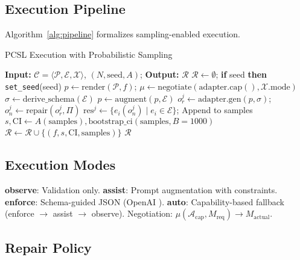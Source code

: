 \documentclass[sigconf]{acmart}
\newcommand{\breakablefunction}[1]{\texttt{\seqsplit{#1}}}
\begin{document}
\subsection{Execution Pipeline}

Algorithm~\ref{alg:pipeline} formalizes sampling-enabled execution.

\begin{algorithm}[t]
\caption{PCSL Execution with Probabilistic Sampling}
\label{alg:pipeline}
\footnotesize
\begin{algorithmic}[1]
\STATE \textbf{Input:} \( \mathcal{C} = \langle \mathcal{P}, \mathcal{E}, \mathcal{X} \rangle \), \( (N, \text{seed}, A) \); \textbf{Output:} \( \mathcal{R} \)
\STATE \( \mathcal{R} \leftarrow \emptyset \); \textbf{if} seed \textbf{then} \texttt{set\_seed}(seed)
  \STATE \( p \leftarrow \text{render}(\mathcal{P}, f) \); \( \mu \leftarrow \text{negotiate}(\text{adapter.cap}(), \mathcal{X}.\text{mode}) \)
   \STATE \( \sigma \leftarrow \text{derive\_schema}(\mathcal{E}) \) \ENDIF
   \STATE \( p \leftarrow \text{augment}(p, \mathcal{E}) \) \ENDIF
    \STATE \( o_r^j \leftarrow \text{adapter.gen}(p, \sigma) \); \( o_n^j \leftarrow \text{repair}(o_r^j, \Pi) \)
    \STATE \( \text{res}^j \leftarrow \{e_i(o_n^j) \mid e_i \in \mathcal{E}\} \); Append to samples
  \ENDFOR
  \STATE \( s, \text{CI} \leftarrow A(\text{samples}), \text{bootstrap\_ci}(\text{samples}, B=1000) \)
  \STATE \( \mathcal{R} \leftarrow \mathcal{R} \cup \{(f, s, \text{CI}, \text{samples})\} \)
\ENDFOR
\RETURN \( \mathcal{R} \)
\end{algorithmic}
\end{algorithm}

\subsection{Execution Modes}

\textbf{observe}: Validation only. \textbf{assist}: Prompt augmentation with constraints. 
\textbf{enforce}: Schema-guided JSON (OpenAI \breakablefunction{response\_format}). 
\textbf{auto}: Capability-based fallback (enforce \(\to\) assist \(\to\) observe). 
Negotiation: \( \mu(\mathcal{A}_{\text{cap}}, M_{\text{req}}) \to M_{\text{actual}} \).

\subsection{Repair Policy}
\end{document}
